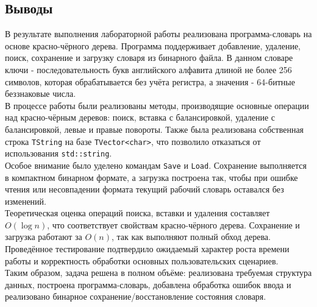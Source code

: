 \documentclass[12pt]{article}
\begin{document}
\subsection*{Выводы}
\hspace{2ex}
В результате выполнения лабораторной работы реализована программа-словарь на основе красно-чёрного дерева. Программа поддерживает добавление, удаление, поиск, сохранение и загрузку словаря из бинарного файла. В данном словаре ключи -  последовательность букв английского алфавита длиной не более 256 символов, которая обрабатывается без учёта регистра, а значения - 64-битные беззнаковые числа. \\

В процессе работы были реализованы методы, производящие основные операции над красно-чёрным деревов: поиск, вставка с балансировкой, удаление с балансировкой, левые и правые повороты. Также была реализована собственная строка \texttt{TString} на базе \texttt{TVector<char>}, что позволило отказаться от использования \texttt{std::string}. \\

Особое внимание было уделено командам \texttt{Save} и \texttt{Load}. Сохранение выполняется в компактном бинарном формате, а загрузка построена так, чтобы при ошибке чтения или несовпадении формата текущий рабочий словарь оставался без изменений. \\

Теоретическая оценка операций поиска, вставки и удаления составляет $O(\log n)$, что соответствует свойствам красно-чёрного дерева. Сохранение и загрузка работают за $O(n)$, так как выполняют полный обход дерева. Проведённое тестирование подтвердило ожидаемый характер роста времени работы и корректность обработки основных пользовательских сценариев. \\

Таким образом, задача решена в полном объёме: реализована требуемая структура данных, построена программа-словарь, добавлена обработка ошибок ввода и реализовано бинарное сохранение/восстановление состояния словаря.
\end{document}
